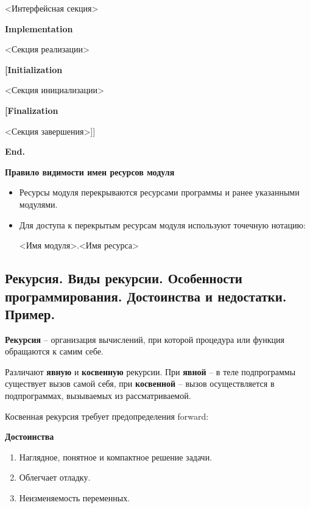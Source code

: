        <Интерфейсная секция>

{\bf Implementation}

       <Секция реализации>

{\bf [Initialization}

       <Секция инициализации>

{\bf [Finalization}

       <Секция завершения>]]
       
{\bf End. }

{\bf Правило видимости имен ресурсов модуля}

\begin{itemize}
\item Ресурсы модуля перекрываются ресурсами программы и ранее указанными модулями.

\item Для доступа к перекрытым ресурсам модуля используют точечную нотацию: 

	<Имя модуля>.<Имя ресурса>

\end{itemize}





\newpage\subsection{Рекурсия.  Виды  рекурсии.  Особенности  программирования. Достоинства  и  недостатки. 
Пример. }

\begin{myquote}
            
\end{myquote}


{\bf Рекурсия} – организация вычислений, при которой процедура или функция обращаются к самим себе.

Различают {\bf явную} и {\bf косвенную} рекурсии. При {\bf{явной}} – в теле подпрограммы существует вызов самой себя, при {\bf{косвенной}} – вызов осуществляется в подпрограммах, вызываемых из рассматриваемой.

Косвенная рекурсия требует предопределения forward:


{\bf Достоинства} 
\begin{enumerate}
\item Наглядное, понятное и компактное решение задачи.
\item Облегчает отладку.
\item Неизменяемость переменных.
\end{enumerate}

